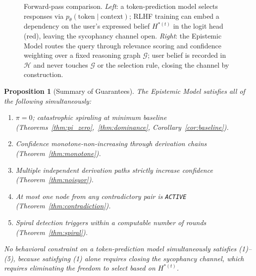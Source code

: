 \documentclass[12pt]{article}
\newtheorem{proposition}{Proposition}
\theoremstyle{definition}
\begin{document}
\begin{figure}[h]
\caption{Forward-pass comparison. \textit{Left}: a token-prediction model
selects responses via $p_\theta(\text{token}\mid\text{context})$; RLHF
training can embed a dependency on the user's expressed belief $H^{*(t)}$
in the logit head (red), leaving the sycophancy channel open.
\textit{Right}: the Epistemic Model routes the query through
relevance scoring and confidence weighting over a fixed reasoning
graph $\mathcal{G}$; user belief is recorded in $\mathcal{H}$
and never touches $\mathcal{G}$ or the selection rule,
closing the channel by construction.}
\label{fig:architecture}
\end{figure}

\begin{proposition}[Summary of Guarantees]
The Epistemic Model satisfies all of the following simultaneously:
\begin{enumerate}
  \item $\pi = 0$; catastrophic spiraling at minimum baseline
        (Theorems~\ref{thm:pi_zero},~\ref{thm:dominance},
        Corollary~\ref{cor:baseline}).
  \item Confidence monotone-non-increasing through derivation chains
        (Theorem~\ref{thm:monotone}).
  \item Multiple independent derivation paths strictly increase
        confidence (Theorem~\ref{thm:noisyor}).
  \item At most one node from any contradictory pair is
        \texttt{ACTIVE} (Theorem~\ref{thm:contradiction}).
  \item Spiral detection triggers within a computable number of
        rounds (Theorem~\ref{thm:spiral}).
\end{enumerate}
No behavioral constraint on a token-prediction model simultaneously
satisfies (1)--(5), because satisfying (1) alone requires closing the
sycophancy channel, which requires eliminating the freedom
to select based on $H^{*(t)}$.
\end{proposition}
\end{document}
